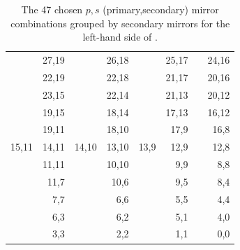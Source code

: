 \begin{table}[htb]
  \caption{
    The 47 chosen $p,s$ (primary,secondary) mirror combinations grouped by secondary mirrors for the left-hand side of \richtwo.}
  \vspace{-0.5\baselineskip}
  \centering
  \small
  \sffamily
  \begin{tabular}{*{4}{|d{2}d{2}}|}
    \hline
           & 27,19 &       & 26,18 &       & 25,17 &       & 24,16 \\
           & 22,19 &       & 22,18 &       & 21,17 &       & 20,16 \\
    \hline
           & 23,15 &       & 22,14 &       & 21,13 &       & 20,12 \\
           & 19,15 &       & 18,14 &       & 17,13 &       & 16,12 \\
    \hline
           & 19,11 &       & 18,10 &       & 17,9  &       & 16,8  \\
     15,11 & 14,11 & 14,10 & 13,10 & 13,9  & 12,9  &       & 12,8  \\
           & 11,11 &       & 10,10 &       &  9,9  &       &  8,8  \\
    \hline
           & 11,7  &       & 10,6  &       &  9,5  &       &  8,4  \\
           &  7,7  &       &  6,6  &       &  5,5  &       &  4,4  \\
    \hline
           &  6,3  &       &  6,2  &       &  5,1  &       &  4,0  \\
           &  3,3  &       &  2,2  &       &  1,1  &       &  0,0  \\
    \hline
  \end{tabular}
  \label{tab:ChosenConbinationsSec}
  \vspace{-0.5\baselineskip}
\end{table}

